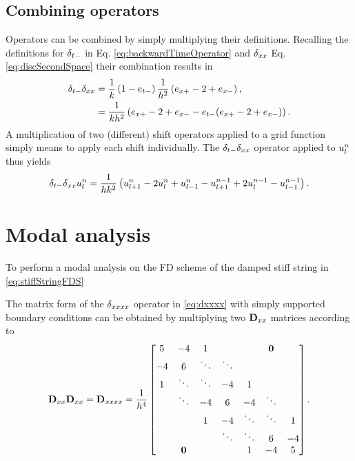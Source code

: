 \subsection{Combining operators}\label{sec:combiningOperators}
Operators can be combined by simply multiplying their definitions. Recalling the definitions for $\delta_{t-}$ in Eq. \eqref{eq:backwardTimeOperator} and $\delta_{xx}$ Eq. \eqref{eq:discSecondSpace} their combination results in
\begin{align*}
    \delta_{t-}\delta_{xx} &= \frac{1}{k}\left(1-e_{t-}\right)\frac{1}{h^2}\left(e_{x+}-2+e_{x-}\right), \\
    &= \frac{1}{kh^2}\left(e_{x+}-2+e_{x-} - e_{t-}(e_{x+}-2+e_{x-})\right).
\end{align*}
%
A multiplication of two (different) shift operators applied to a grid function simply means to apply each shift individually. The $\delta_{t-}\delta_{xx}$ operator applied to $u_l^n$ thus yields
\begin{equation}
    \delta_{t-} \delta_{xx} u_l^n = \frac{1}{hk^2}\left(u_{l+1}^n - 2 u_l^n + u_{l-1}^n - u_{l+1}^{n-1} + 2 u_l^{n-1} - u_{l-1}^{n-1}\right).
\end{equation}



\section{Modal analysis}
To perform a modal analysis on the FD scheme of the damped stiff string in \eqref{eq:stiffStringFDS} 

The matrix form of the $\delta_{xxxx}$ operator in \eqref{eq:dxxxx} with simply supported boundary conditions can be obtained by multiplying two $\mathbf{D}_{xx}$ matrices according to
\begin{equation}
    \mathbf{D}_{xx}\mathbf{D}_{xx} = \mathbf{D}_{xxxx} = \frac{1}{h^4}\begin{bmatrix}
        5& -4 & 1 & & & \mathbf{0}& \\
        -4 & 6 &\ddots &\ddots & & & \\
        1& \ddots & \ddots & -4 & 1 & & \\
        & \ddots& -4 & 6 & -4 & \ddots& \\
        & & 1 & -4 & \ddots & \ddots &1 \\
        & & & \ddots & \ddots & 6 & -4 \\
        & \mathbf{0} & & & 1& -4 & 5 \\
    \end{bmatrix}.
\end{equation}
